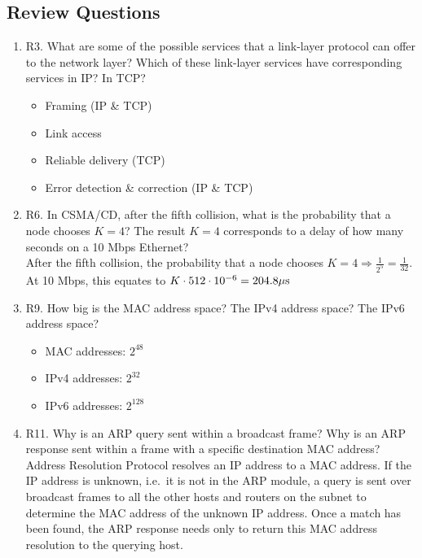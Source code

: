 \documentclass[12pt]{article}
\begin{document}
\subsection*{Review Questions}
\begin{enumerate}
\item R3. What are some of the possible services that a link-layer protocol can offer to the network layer? Which of these link-layer services have corresponding services in IP\@? In TCP\@?
    \begin{itemize}
        \item Framing (IP \& TCP)
        \item Link access
        \item Reliable delivery (TCP)
        \item Error detection \& correction (IP \& TCP)
    \end{itemize}
\item R6. In CSMA/CD, after the fifth collision, what is the probability that a node chooses \(K = 4\)? The result \(K = 4\) corresponds to a delay of how many seconds on a 10 Mbps Ethernet?\\[1em]
        After the fifth collision, the probability that a node chooses \(K=4 \Rightarrow\frac{1}{2^5}=\frac{1}{32}\). At 10 Mbps, this equates to \(K\cdot512\cdot10^{-6}=204.8\rm{\mu s}\)
\item R9. How big is the MAC address space? The IPv4 address space? The IPv6 address space?
    \begin{itemize}
        \item MAC addresses: \(2^{48}\)
        \item IPv4 addresses: \(2^{32}\)
        \item IPv6 addresses: \(2^{128}\)
    \end{itemize}
\item R11. Why is an ARP query sent within a broadcast frame? Why is an ARP response sent within a frame with a specific destination MAC address?\\[1em]
Address Resolution Protocol resolves an IP address to a MAC address. If the IP address is unknown, i.e.\ it is not in the ARP module, a query is sent over broadcast frames to all the other hosts and routers on the subnet to determine the MAC address of the unknown IP address. Once a match has been found, the ARP response needs only to return this MAC address resolution to the querying host.
\end{enumerate}
\end{document}
